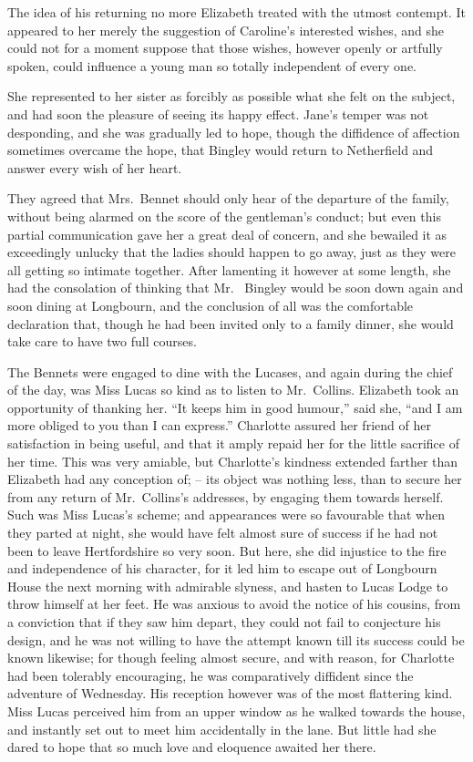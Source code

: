 The idea of his returning no more Elizabeth treated
with the utmost contempt. It appeared to her merely the
suggestion of Caroline’s interested wishes, and she could
not for a moment suppose that those wishes, however
openly or artfully spoken, could influence a young man so
totally independent of every one.

She represented to her sister as forcibly as possible
what she felt on the subject, and had soon the pleasure
of seeing its happy effect. Jane’s temper was not desponding,
and she was gradually led to hope, though the
diffidence of affection sometimes overcame the hope, that
Bingley would return to Netherfield and answer every wish
of her heart.

They agreed that Mrs.\ Bennet should only hear of the
departure of the family, without being alarmed on
the score of the gentleman’s conduct; but even this
partial communication gave her a great deal of concern,
and she bewailed it as exceedingly unlucky that the ladies
should happen to go away, just as they were all getting
so intimate together. After lamenting it however at some
length, she had the consolation of thinking that Mr.\ %
Bingley would be soon down again and soon dining at
Longbourn, and the conclusion of all was the comfortable
declaration that, though he had been invited only to a
family dinner, she would take care to have two full
courses.


The Bennets were engaged to dine with the Lucases,
and again during the chief of the day, was Miss Lucas so
kind as to listen to Mr.\ Collins. Elizabeth took an opportunity
of thanking her. “It keeps him in good humour,”
said she, “and I am more obliged to you than I can
express.” Charlotte assured her friend of her satisfaction
in being useful, and that it amply repaid her for the little
sacrifice of her time. This was very amiable, but Charlotte’s
kindness extended farther than Elizabeth had any
conception of; -- its object was nothing less, than to secure
her from any return of Mr.\ Collins’s addresses, by engaging
them towards herself. Such was Miss Lucas’s scheme;
and appearances were so favourable that when they
parted at night, she would have felt almost sure of success
if he had not been to leave Hertfordshire so very soon.
But here, she did injustice to the fire and independence
of his character, for it led him to escape out of Longbourn
House the next morning with admirable slyness, and
hasten to Lucas Lodge to throw himself at her feet. He
was anxious to avoid the notice of his cousins, from
a conviction that if they saw him depart, they could not
fail to conjecture his design, and he was not willing to
have the attempt known till its success could be known
likewise; for though feeling almost secure, and with
reason, for Charlotte had been tolerably encouraging, he
was comparatively diffident since the adventure of Wednesday.
His reception however was of the most flattering
kind. Miss Lucas perceived him from an upper window
as he walked towards the house, and instantly set out
to meet him accidentally in the lane. But little had she
dared to hope that so much love and eloquence awaited
her there.

